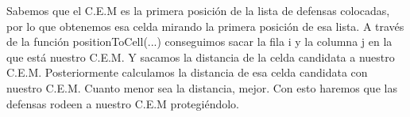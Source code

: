 Sabemos que el C.E.M es la primera posición de la lista de defensas colocadas, por lo que obtenemos esa celda mirando la primera posición de esa lista.
A través de la función positionToCell(...) conseguimos sacar la fila i y la columna j en la que está nuestro C.E.M.
Y sacamos la distancia de la celda candidata a nuestro C.E.M.
Posteriormente calculamos la distancia de esa celda candidata con nuestro C.E.M. Cuanto menor sea la distancia, mejor.
Con esto haremos que las defensas rodeen a nuestro C.E.M protegiéndolo.